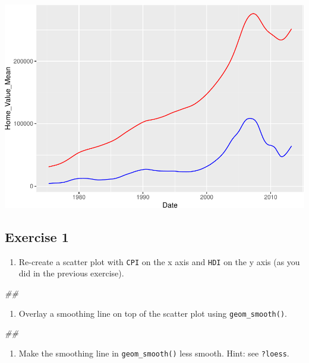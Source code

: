\documentclass[
]{book}
\newenvironment{Shaded}{\begin{snugshade}}{\end{snugshade}}
\newcommand{\CommentTok}[1]{\textcolor[rgb]{0.56,0.35,0.01}{\textit{#1}}}
\providecommand{\tightlist}{%
  \setlength{\itemsep}{0pt}\setlength{\parskip}{0pt}}
\begin{document}
\includegraphics{R/Rgraphics/figures/unnamed-chunk-185-1.pdf}

\hypertarget{exercise-1-2}{%
\subsection{Exercise 1}\label{exercise-1-2}}

\begin{enumerate}
\def\labelenumi{\arabic{enumi}.}
\tightlist
\item
  Re-create a scatter plot with \texttt{CPI} on the x axis and \texttt{HDI} on the y axis (as you did in the previous exercise).
\end{enumerate}

\begin{Shaded}
\begin{Highlighting}[]
\CommentTok{\#\# }
\end{Highlighting}
\end{Shaded}

\begin{enumerate}
\def\labelenumi{\arabic{enumi}.}
\setcounter{enumi}{1}
\tightlist
\item
  Overlay a smoothing line on top of the scatter plot using \texttt{geom\_smooth()}.
\end{enumerate}

\begin{Shaded}
\begin{Highlighting}[]
\CommentTok{\#\# }
\end{Highlighting}
\end{Shaded}

\begin{enumerate}
\def\labelenumi{\arabic{enumi}.}
\setcounter{enumi}{2}
\tightlist
\item
  Make the smoothing line in \texttt{geom\_smooth()} less smooth. Hint: see \texttt{?loess}.
\end{enumerate}
\end{document}
